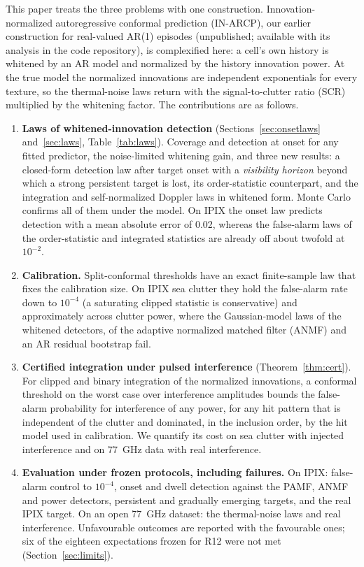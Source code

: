 \documentclass[journal]{IEEEtran}
\begin{document}
This paper treats the three problems with one construction. Innovation-normalized autoregressive conformal prediction (IN-ARCP), our earlier construction for real-valued AR(1) episodes (unpublished; available with its analysis in the code repository), is complexified here: a cell's own history is whitened by an AR model and normalized by the history innovation power. At the true model the normalized innovations are independent exponentials for every texture, so the thermal-noise laws return with the signal-to-clutter ratio (SCR) multiplied by the whitening factor. The contributions are as follows.
\begin{enumerate}[leftmargin=*,itemsep=2pt]
\item \textbf{Laws of whitened-innovation detection} (Sections~\ref{sec:onsetlaws} and~\ref{sec:laws}, Table~\ref{tab:laws}). Coverage and detection at onset for any fitted predictor, the noise-limited whitening gain, and three new results: a closed-form detection law after target onset with a \emph{visibility horizon} beyond which a strong persistent target is lost, its order-statistic counterpart, and the integration and self-normalized Doppler laws in whitened form. Monte Carlo confirms all of them under the model. On IPIX the onset law predicts detection with a mean absolute error of 0.02, whereas the false-alarm laws of the order-statistic and integrated statistics are already off about twofold at $10^{-2}$.
\item \textbf{Calibration.} Split-conformal thresholds have an exact finite-sample law that fixes the calibration size. On IPIX sea clutter they hold the false-alarm rate down to $10^{-4}$ (a saturating clipped statistic is conservative) and approximately across clutter power, where the Gaussian-model laws of the whitened detectors, of the adaptive normalized matched filter (ANMF) and an AR residual bootstrap fail.
\item \textbf{Certified integration under pulsed interference} (Theorem~\ref{thm:cert}). For clipped \cite{abbasi2018clip} and binary integration of the normalized innovations, a conformal threshold on the worst case over interference amplitudes bounds the false-alarm probability for interference of any power, for any hit pattern that is independent of the clutter and dominated, in the inclusion order, by the hit model used in calibration. We quantify its cost on sea clutter with injected interference and on 77~GHz data with real interference.
\item \textbf{Evaluation under frozen protocols, including failures.} On IPIX: false-alarm control to $10^{-4}$, onset and dwell detection against the PAMF, ANMF and power detectors, persistent and gradually emerging targets, and the real IPIX target. On an open 77~GHz dataset: the thermal-noise laws and real interference. Unfavourable outcomes are reported with the favourable ones; six of the eighteen expectations frozen for R12 were not met (Section~\ref{sec:limits}).
\end{enumerate}
\end{document}
